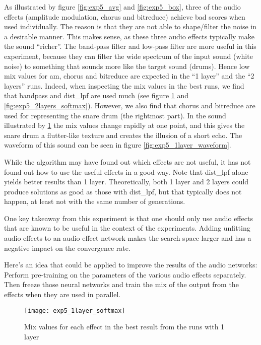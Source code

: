As illustrated by figure \ref{fig:exp5_avg} and \ref{fig:exp5_box}, three of the audio effects (amplitude modulation, chorus and bitreduce) achieve bad scores when used individually. The reason is that they are not able to shape/filter the noise in a desirable manner. This makes sense, as these three audio effects typically make the sound ``richer''. The band-pass filter and low-pass filter are more useful in this experiment, because they can filter the wide spectrum of the input sound (white noise) to something that sounds more like the target sound (drums). Hence low mix values for am, chorus and bitreduce are expected in the ``1 layer'' and the ``2 layers'' runs. Indeed, when inspecting the mix values in the best runs, we find that bandpass and dist\_lpf are used much (see figure \ref{fig:exp5_1layer_softmax} and \ref{fig:exp5_2layers_softmax}). However, we also find that chorus and bitreduce are used for representing the snare drum (the rightmost part). In the sound illustrated by \ref{fig:exp5_1layer_softmax} the mix values change rapidly at one point, and this gives the snare drum a flutter-like texture and creates the illusion of a short echo. The waveform of this sound can be seen in figure \ref{fig:exp5_1layer_waveform}.

While the algorithm may have found out which effects are not useful, it has not found out how to use the useful effects in a good way. Note that dist\_lpf alone yields better results than 1 layer. Theoretically, both 1 layer and 2 layers could produce solutions as good as those with dist\_lpf, but that typically does not happen, at least not with the same number of generations.

One key takeaway from this experiment is that one should only use audio effects that are known to be useful in the context of the experiments. Adding unfitting audio effects to an audio effect network makes the search space larger and has a negative impact on the convergence rate.

Here's an idea that could be applied to improve the results of the audio networks: Perform pre-training on the parameters of the various audio effects separately. Then freeze those neural networks and train the mix of the output from the effects when they are used in parallel.



\begin{figure}[h]
    \centering
    \texttt{[image: exp5\_1layer\_softmax]}
    \caption{Mix values for each effect in the best result from the runs with 1 layer}
    \label{fig:exp5_1layer_softmax}
\end{figure}

